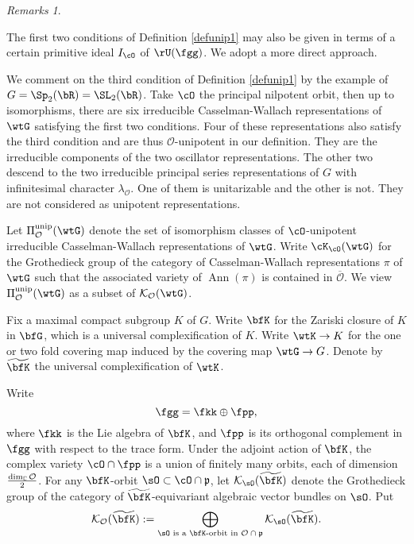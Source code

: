 \documentclass[12pt,a4paper]{amsart}
\newcommand{\CK}{{\mathcal {K}}}
\newcommand{\CO}{{\mathcal {O}}}
\DeclareMathOperator{\Ann}{Ann}
\newcommand{\wt}{\widetilde}
\newcommand{\p}{\mathfrak p}
\numberwithin{equation}{section}
\theoremstyle{remark}
\newtheorem*{remarks}{Remarks}
\def\wtbfK{\widetilde{\bfK}}
\begin{document}
\begin{remarks}
\begin{enumR}
\item The first two conditions of Definition \ref{defunip1} may also be given in terms of a certain primitive ideal $I_{\cO}$ of $\rU(\fgg)$. We adopt a more direct approach.
  \item We comment on the third condition of Definition \ref{defunip1} by the example of $G=\Sp_2(\bR)=\SL_2(\bR)$. Take $\cO$ the principal nilpotent
  orbit, then up to isomorphisms, there are six irreducible Casselman-Wallach
  representations of $\wtG$ satisfying the first two conditions. Four of these
  representations also satisfy the third condition and are thus $\CO$-unipotent
  in our definition. They are the irreducible components of the two oscillator representations.  The other two descend to the two irreducible principal series representations
  of $G$ with infinitesimal character $\lambda_\CO$. One of them is unitarizable and the other is not. They are not considered as unipotent representations.
  \end{enumR}
  \end{remarks}



Let $\Pi^{\mathrm{unip}}_{\CO}(\wtG)$ denote the set of isomorphism classes of
$\cO$-unipotent irreducible Casselman-Wallach representations of $\wtG$.  Write
$\cK_{\cO}(\wtG)$ for the Grothedieck group of the category of Casselman-Wallach
representations $\pi$ of $\wtG$ such that the associated variety of $\Ann(\pi)$ is contained in $\overline \CO$.  We view $\Pi^\mathrm{unip}_{\CO}(\wtG)$ as a subset of
$\CK_{\CO}(\wtG)$.


Fix a maximal compact subgroup $K$ of $G$. Write $\bfK$ for the Zariski closure
of $K$ in $\bfG$, which is a universal complexification of $K$.  Write $\wtK\rightarrow K$ for the one or two fold covering map  induced by the
 covering map $\wtG\rightarrow G$.  Denote by $\wtbfK$ the universal
complexification of $\wtK$.

Write
\[
  \fgg=\fkk\oplus \fpp,
\]
where $\fkk$ is the Lie algebra of $\bfK$, and $\fpp$ is its orthogonal
complement in $\fgg$ with respect to the trace form. Under the adjoint action
of $\bfK$, the complex variety $\cO\cap \fpp$ is a union of finitely many
orbits, each of dimension $\frac{\dim_\C \CO}{2}$.  For any $\bfK$-orbit
$\sO\subset \cO\cap \p$, let $\CK_{\sO}(\wt{\bfK})$ denote the Grothedieck group
of the category of $\wt{\bfK}$-equivariant algebraic vector bundles on $\sO$.
Put
\[
  \CK_{\CO}(\wtbfK):=\bigoplus_{\sO\textrm{ is a $\bfK$-orbit in $\CO\cap \p$}}
  \mathrm \CK_{\sO}(\wt{\bfK}).
\]
\end{document}
